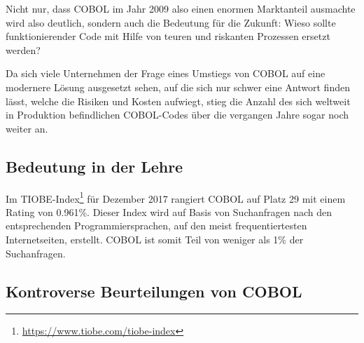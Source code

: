 Nicht nur, dass COBOL im Jahr 2009 also einen enormen Marktanteil ausmachte wird also deutlich, sondern auch die Bedeutung für die Zukunft: Wieso sollte funktionierender Code mit Hilfe von teuren und riskanten Prozessen ersetzt werden?

Da sich viele Unternehmen der Frage eines Umstiegs von COBOL auf eine modernere Lösung ausgesetzt sehen, auf die sich nur schwer eine Antwort finden lässt, welche die Risiken und Kosten aufwiegt, stieg die Anzahl  des sich weltweit in Produktion befindlichen COBOL-Codes über die vergangen Jahre sogar noch weiter an.

\subsection{Bedeutung in der Lehre}



Im TIOBE-Index\footnote{\url{https://www.tiobe.com/tiobe-index}} für Dezember 2017 rangiert COBOL auf Platz 29 mit einem Rating von 0.961\%. Dieser Index wird auf Basis von Suchanfragen nach den entsprechenden Programmiersprachen, auf den meist frequentiertesten Internetseiten, erstellt. COBOL ist somit Teil von weniger als 1\% der Suchanfragen.


\subsection{Kontroverse Beurteilungen von COBOL}
